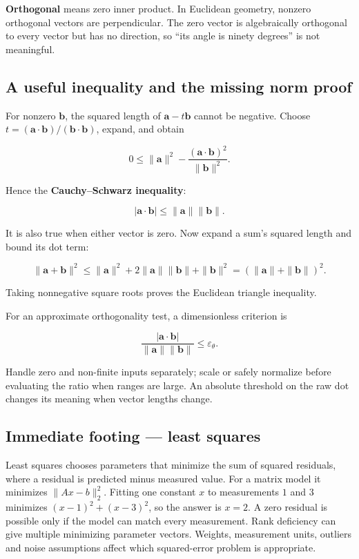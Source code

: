 \textbf{Orthogonal} means zero inner product. In Euclidean geometry, nonzero orthogonal vectors are perpendicular. The zero vector is algebraically orthogonal to every vector but has no direction, so ``its angle is ninety degrees'' is not meaningful.

\subsection{A useful inequality and the missing norm proof}\label{01-foundations-i-ch017-a-useful-inequality-and-the-missing-norm-proof}

For nonzero \(\mathbf b\), the squared length of \(\mathbf a-t\mathbf b\) cannot be negative. Choose \(t=(\mathbf a\cdot\mathbf b)/(\mathbf b\cdot\mathbf b)\), expand, and obtain

\[
0\le\|\mathbf a\|^2-
\frac{(\mathbf a\cdot\mathbf b)^2}{\|\mathbf b\|^2}.
\]

Hence the \textbf{Cauchy--Schwarz inequality}:

\[
|\mathbf a\cdot\mathbf b|\le\|\mathbf a\|\|\mathbf b\|.
\]

It is also true when either vector is zero. Now expand a sum's squared length and bound its dot term:

\[
\|\mathbf a+\mathbf b\|^2
\le\|\mathbf a\|^2+2\|\mathbf a\|\|\mathbf b\|+\|\mathbf b\|^2
=(\|\mathbf a\|+\|\mathbf b\|)^2.
\]

Taking nonnegative square roots proves the Euclidean triangle inequality.

For an approximate orthogonality test, a dimensionless criterion is

\[
\frac{|\mathbf a\cdot\mathbf b|}{\|\mathbf a\|\|\mathbf b\|}
\le\varepsilon_\theta.
\]

Handle zero and non-finite inputs separately; scale or safely normalize before evaluating the ratio when ranges are large. An absolute threshold on the raw dot changes its meaning when vector lengths change.

\subsection{Immediate footing --- least squares}\label{01-foundations-i-ch017-immediate-footing-least-squares}

Least squares chooses parameters that minimize the sum of squared residuals, where a residual is predicted minus measured value. For a matrix model it minimizes \(\lVert Ax-b\rVert_2^2\). Fitting one constant \(x\) to measurements \(1\) and \(3\) minimizes \((x-1)^2+(x-3)^2\), so the answer is \(x=2\). A zero residual is possible only if the model can match every measurement. Rank deficiency can give multiple minimizing parameter vectors. Weights, measurement units, outliers and noise assumptions affect which squared-error problem is appropriate.

